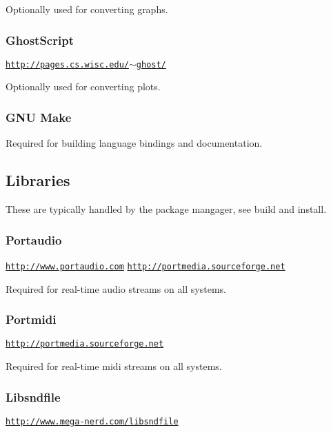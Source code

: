 Optionally used for converting graphs.

\subsubsection*{Ghost\-Script}

\href{http://pages.cs.wisc.edu/~ghost/}{\tt http\-://pages.\-cs.\-wisc.\-edu/$\sim$ghost/}

Optionally used for converting plots.

\subsubsection*{G\-N\-U Make}

Required for building language bindings and documentation.\hypertarget{md__build_and_install_Libraries}{}\subsection{Libraries}\label{md__build_and_install_Libraries}
\label{md__build_and_install_Libraries}%
\hypertarget{md__build_and_install_Libraries}{}%
 These are typically handled by the package mangager, see build and install.

\subsubsection*{Portaudio}

\href{http://www.portaudio.com}{\tt http\-://www.\-portaudio.\-com} \href{http://portmedia.sourceforge.net}{\tt http\-://portmedia.\-sourceforge.\-net}

Required for real-\/time audio streams on all systems.

\subsubsection*{Portmidi}

\href{http://portmedia.sourceforge.net}{\tt http\-://portmedia.\-sourceforge.\-net}

Required for real-\/time midi streams on all systems.

\subsubsection*{Libsndfile}

\href{http://www.mega-nerd.com/libsndfile}{\tt http\-://www.\-mega-\/nerd.\-com/libsndfile}

